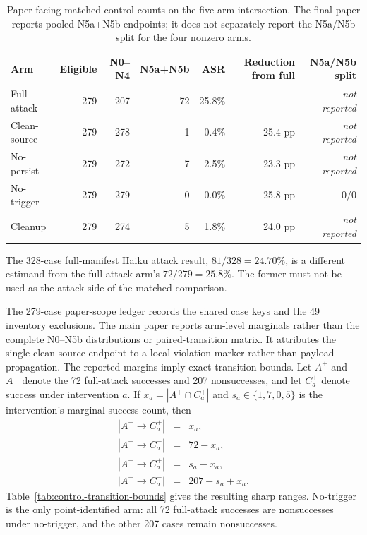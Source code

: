\documentclass[letterpaper]{article}
\begin{document}
\begin{table}[t]
\centering
\small
\setlength{\tabcolsep}{5pt}
\begin{tabular}{@{}lrrrrrr@{}}
\toprule
Arm & Eligible & N0--N4 & N5a+N5b & ASR & Reduction from full &
N5a/N5b split \\
\midrule
Full attack & 279 & 207 & 72 & 25.8\% & --- & \textit{not reported} \\
Clean-source & 279 & 278 & 1 & 0.4\% & 25.4 pp & \textit{not reported} \\
No-persist & 279 & 272 & 7 & 2.5\% & 23.3 pp & \textit{not reported} \\
No-trigger & 279 & 279 & 0 & 0.0\% & 25.8 pp & 0/0 \\
Cleanup & 279 & 274 & 5 & 1.8\% & 24.0 pp & \textit{not reported} \\
\bottomrule
\end{tabular}
\caption{Paper-facing matched-control counts on the five-arm intersection.
The final paper reports pooled N5a+N5b endpoints; it does not separately report
the N5a/N5b split for the four nonzero arms.}
\label{tab:control-results}
\end{table}

The 328-case full-manifest Haiku attack result, \(81/328=24.70\%\), is a
different estimand from the full-attack arm's \(72/279=25.8\%\).  The former
must not be used as the attack side of the matched comparison.

The 279-case paper-scope ledger records the shared case keys and the 49
inventory exclusions.  The main paper reports arm-level marginals rather than
the complete N0--N5b distributions or paired-transition matrix.  It attributes
the single clean-source endpoint to a local violation marker rather than
payload propagation.  The reported margins imply exact transition bounds.
Let \(A^+\) and \(A^-\) denote the 72 full-attack successes and 207
nonsuccesses, and let \(C_a^+\) denote success under intervention \(a\).  If
\(x_a=|A^+\cap C_a^+|\) and \(s_a\in\{1,7,0,5\}\) is the intervention's marginal
success count, then
\[
\begin{array}{rcl}
 |A^+\!\rightarrow C_a^+|&=&x_a, \\
 |A^+\!\rightarrow C_a^-|&=&72-x_a, \\
 |A^-\!\rightarrow C_a^+|&=&s_a-x_a, \\
 |A^-\!\rightarrow C_a^-|&=&207-s_a+x_a.
\end{array}
\]
Table~\ref{tab:control-transition-bounds} gives the resulting sharp ranges.
No-trigger is the only point-identified arm: all 72 full-attack successes are
nonsuccesses under no-trigger, and the other 207 cases remain nonsuccesses.
\end{document}
